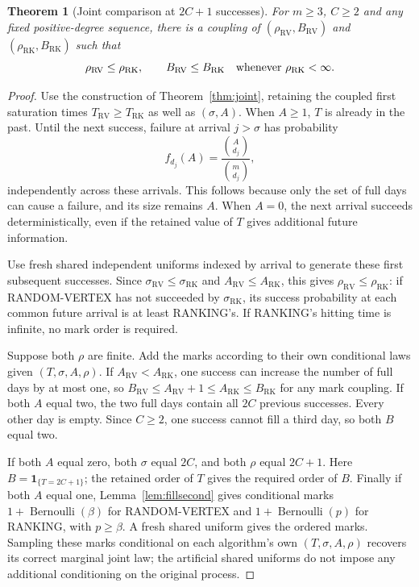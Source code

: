 \documentclass[11pt]{article}
\newtheorem{theorem}{Theorem}
\newcommand{\RV}{\mathrm{RV}}
\newcommand{\RK}{\mathrm{RK}}
\begin{document}
\begin{theorem}[Joint comparison at $2C+1$ successes]\label{thm:jointplus1}
For $m\geq3$, $C\geq2$ and any fixed positive-degree sequence, there
is a coupling of $(\rho_\RV,B_\RV)$ and $(\rho_\RK,B_\RK)$ such that
\[
 \rho_\RV\leq\rho_\RK,\qquad
 B_\RV\leq B_\RK\quad\hbox{whenever }\rho_\RK<\infty.
\]
\end{theorem}
\begin{proof}
Use the construction of Theorem~\ref{thm:joint}, retaining the coupled
first saturation times $T_\RV\geq T_\RK$ as well as $(\sigma,A)$.
When $A\geq1$, $T$ is already in the past. Until the next success,
failure at arrival $j>\sigma$ has probability
\[
 f_{d_j}(A)=\frac{\binom{A}{d_j}}{\binom{m}{d_j}},
\]
independently across these arrivals. This follows because only the
set of full days can cause a failure, and its size remains $A$.
When $A=0$, the next arrival succeeds deterministically, even if the
retained value of $T$ gives additional future information.

Use fresh shared independent uniforms indexed by arrival to generate
these first subsequent successes. Since $\sigma_\RV\leq\sigma_\RK$
and $A_\RV\leq A_\RK$, this gives $\rho_\RV\leq\rho_\RK$:
if RANDOM-VERTEX has not succeeded by $\sigma_\RK$, its success
probability at each common future arrival is at least RANKING's.
If RANKING's hitting time is infinite, no mark order is required.

Suppose both $\rho$ are finite. Add the marks according to their own
conditional laws given $(T,\sigma,A,\rho)$. If $A_\RV<A_\RK$, one
success can increase the number of full days by at most one, so
$B_\RV\leq A_\RV+1\leq A_\RK\leq B_\RK$ for any mark coupling.
If both $A$ equal two, the two full days contain all $2C$ previous
successes. Every other day is empty. Since $C\geq2$, one success
cannot fill a third day, so both $B$ equal two.

If both $A$ equal zero, both $\sigma$ equal $2C$, and both $\rho$
equal $2C+1$. Here $B=\mathbf1_{\{T=2C+1\}}$; the retained order
of $T$ gives the required order of $B$. Finally if both $A$ equal one,
Lemma~\ref{lem:fillsecond} gives conditional marks
$1+\operatorname{Bernoulli}(\beta)$ for RANDOM-VERTEX and
$1+\operatorname{Bernoulli}(p)$ for RANKING, with $p\geq\beta$.
A fresh shared uniform gives the ordered marks. Sampling these marks
conditional on each algorithm's own $(T,\sigma,A,\rho)$ recovers
its correct marginal joint law; the artificial shared uniforms do not
impose any additional conditioning on the original process.
\end{proof}
\end{document}
